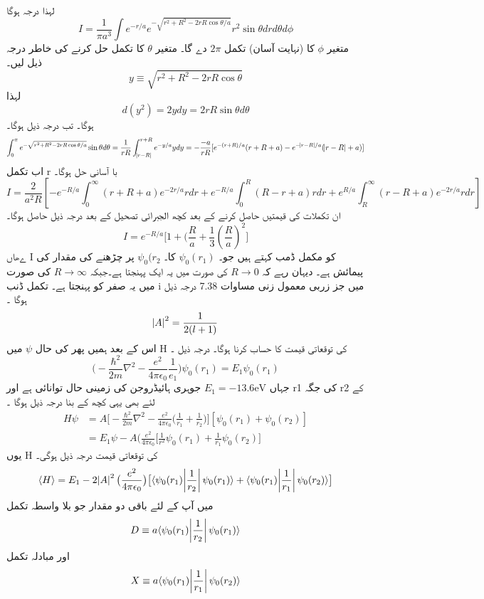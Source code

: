 %
لہذا درجہ ہوگا \\
\[I=\frac{1}{\pi a^{3}}\int e^{-r/a}e^{-\sqrt{r^{2}+R^{2}-2rR\cos{\theta/a}}}r^{2}\sin{\theta}drd\theta d\phi\]
متغیر 
\(\phi\)
 کا (نہایت آسان)  تکمل 
 \(2\pi\)
  دے گا۔ متغیر 
  \(\theta\)
   کا تکمل حل کرنے کی خاطر درجہ ذیل لیں۔\\
\[y\equiv\sqrt{r^{2}+R^{2}-2rR\cos{\theta}}\]
لہذا 
\[d(y^{2})=2ydy=2rR\sin{\theta}d\theta\]
ہوگا۔ تب درجہ ذیل ہوگا۔
\[\int_{0}^{\pi}e^{-\sqrt{r^{2}+R^{2}-2rR\cos{\theta/a}}}\sin{\theta}d\theta=\frac{1}{rR}\int_{\abs{r-R}}^{r+R}e^{-y/a}ydy=-\frac{-a}{rR}[e^{-(r+R)/a}(r+R+a)-e^{-\abs{r-R}/a}(\abs{r-R}+a)]\]
اب تکمل r با آسانی حل ہوگا۔ 
\[I=\frac{2}{a^{2}R}[-e^{-R/a}\int_{0}^{\infty}(r+R+a)e^{-2r/a}rdr+e^{-R/a}\int_{0}^{R}(R-r+a)rdr+e^{R/a}\int_{R}^{\infty}(r-R+a)e^{-2r/a}rdr]\]
ان تکملات کی قیمتیں حاصل کرنے کے بعد کچھ الجبرائی تصحیل کے بعد درجہ ذیل حاصل ہوگا۔
\[I=e^{-R/a}\big[1+(\frac{R}{a}+\frac{1}{3}(\frac{R}{a})^{2}\big]\]
ےھاں  ٰI کو مکمل ڈمب کہتے ہیں جو۔
\(\psi_{0}(r_{1})\)
 کا۔
 \(\psi_{0}(r_{2}\)
 پر چڑھنے کی مقدار کی پیمائش ہے۔ دیہان رہے کہ 
 \(R\rightarrow 0\)
  کی صورت میں یہ ایک پہنجتا ہے۔جبکہ 
  \(R\rightarrow \infty\)
   کی صورت میں یہ صفر کو پہنجتا ہے۔ تکمل ڈنب i میں جز زربی معمول زنی مساوات 7.38 درجہ ذیل ہوگا ۔\\
\[\abs{A}^{2}=\frac{1}{2(l+1)}\]
اس کے بعد ہمیں پھر کی حال 
\(\psi\)
 میں H کی توقعاتی قیمت کا حساب کرنا ہوگا۔ درجہ ذیل ۔
 \[\big(-\frac{\hbar^{2}}{2m}\nabla^{2}-\frac{e^{2}}{4\pi\epsilon_{0}}\frac{1}{e_{1}}\big)\psi_{0}(r_{1})=E_{1}\psi_{0}(r_{1})\]
  جہاں 
  \(E_{1}=-13.6\text{eV}\)
  جوہری ہائیڈروجن کی زمینی حال توانائی ہے اور r1 کی جگہ r2 کے لئے بھی یہی کچھ کے بنا  درجہ ذیل ہوگا ۔
\begin{align*}
H\psi&=A\big[-\frac{\hbar^{2}}{2m}\nabla^{2}-\frac{e^{2}}{4\pi\epsilon_{0}}\big(\frac{1}{r_{1}}+\frac{1}{r_{2}}\big)\big][\psi_{0}(r_{1})+\psi_{0}(r_{2})]\\
&=E_{1}\psi-A(\frac{e^{2}}{4\pi\epsilon_{0}}\big[\frac{1}{r^{2}}\psi_{0}(r_{1})+\frac{1}{r_{1}}\psi_{0}(r_{2})\big]
\end{align*}
یوں H کی توقعاتی قیمت درجہ ذیل ہوگی۔
\[\langle H \rangle =E_{1}-2\abs{A}^{2}\big(\frac{e^{2}}{4\pi\epsilon_{0}}\big)\big[\langle \psi_{0}(r_{1})\abs{\frac{1}{r_{2}}}\psi_{0}(r_{1})\rangle +\langle \psi_{0}(r_{1})\abs{\frac{1}{r_{1}}}\psi_{0}(r_{2})\rangle\big]\]
میں آپ کے لئے باقی دو مقدار جو بلا واسطہ تکمل 
\[D\equiv a\langle \psi_{0}(r_{1})\abs{\frac{1}{r_{2}}}\psi_{0}(r_{1})\rangle\]
اور
مبادلہ تکمل 
\[X\equiv a\langle\psi_{0}(r_{1})\abs{\frac{1}{r_{1}}}\psi_{0}(r_{2})\rangle\]
